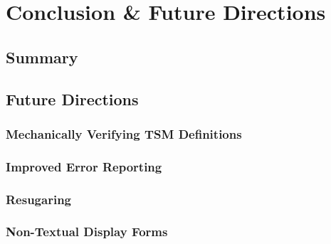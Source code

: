 \chapter{Conclusion \& Future Directions}\label{chap:conclusion}
\section{Summary}

\section{Future Directions}
\subsection{Mechanically Verifying TSM Definitions}\label{sec:verifying-tsms}
\subsection{Improved Error Reporting}\label{sec:error-handling}
\subsection{Resugaring}\label{sec:resugaring}
\subsection{Non-Textual Display Forms}\label{sec:non-textual-display-forms}
